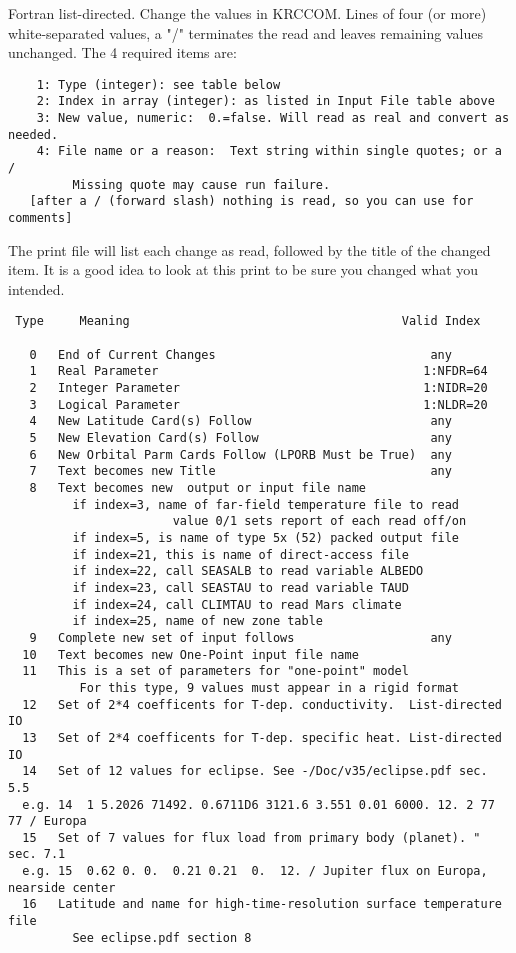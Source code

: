 \documentclass{article}
\begin{document}
Fortran list-directed.  Change the values in KRCCOM.  Lines of four (or more) 
white-separated values, a "/" terminates the read and leaves remaining values
unchanged.  The 4 required items are:
\vspace{-3.mm} 
\begin{verbatim}
    1: Type (integer): see table below
    2: Index in array (integer): as listed in Input File table above
    3: New value, numeric:  0.=false. Will read as real and convert as needed.
    4: File name or a reason:  Text string within single quotes; or a /
         Missing quote may cause run failure.
   [after a / (forward slash) nothing is read, so you can use for comments]
\end{verbatim}
The print file will list each change as read, followed by the title of the
changed item. It is a good idea to look at this print to be sure you changed
what you intended.
\vspace{-3.mm} 
\begin{verbatim}
 Type     Meaning                                      Valid Index

   0   End of Current Changes                              any
   1   Real Parameter                                     1:NFDR=64
   2   Integer Parameter                                  1:NIDR=20
   3   Logical Parameter                                  1:NLDR=20
   4   New Latitude Card(s) Follow                         any
   5   New Elevation Card(s) Follow                        any
   6   New Orbital Parm Cards Follow (LPORB Must be True)  any
   7   Text becomes new Title                              any
   8   Text becomes new  output or input file name
         if index=3, name of far-field temperature file to read
                       value 0/1 sets report of each read off/on
         if index=5, is name of type 5x (52) packed output file
         if index=21, this is name of direct-access file
         if index=22, call SEASALB to read variable ALBEDO
         if index=23, call SEASTAU to read variable TAUD
         if index=24, call CLIMTAU to read Mars climate
         if index=25, name of new zone table
   9   Complete new set of input follows                   any
  10   Text becomes new One-Point input file name
  11   This is a set of parameters for "one-point" model 
          For this type, 9 values must appear in a rigid format
  12   Set of 2*4 coefficents for T-dep. conductivity.  List-directed IO
  13   Set of 2*4 coefficents for T-dep. specific heat. List-directed IO 
  14   Set of 12 values for eclipse. See -/Doc/v35/eclipse.pdf sec. 5.5 
  e.g. 14  1 5.2026 71492. 0.6711D6 3121.6 3.551 0.01 6000. 12. 2 77 77 / Europa
  15   Set of 7 values for flux load from primary body (planet). " sec. 7.1
  e.g. 15  0.62 0. 0.  0.21 0.21  0.  12. / Jupiter flux on Europa, nearside center
  16   Latitude and name for high-time-resolution surface temperature file
         See eclipse.pdf section 8


\end{verbatim}
\end{document}

